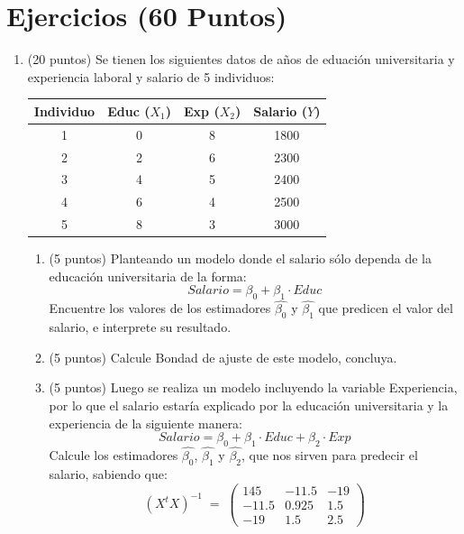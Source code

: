 \documentclass[10pt,a4paper]{article}
\begin{document}
\section{Ejercicios (60 Puntos)}

\begin{enumerate}


\item (20 puntos) Se tienen los siguientes datos de años de eduación universitaria y experiencia laboral y salario de 5 individuos:
\begin{center}
\begin{tabular}{|c|c|c|c|}
\hline
\textbf{Individuo} & \textbf{Educ} ($X_1$) & \textbf{Exp} ($X_2$)  & \textbf{Salario ($Y$)}\\
\hline
1 & 0 &  8 & 1800 \\
2 & 2 &  6 & 2300 \\
3 & 4 &  5 & 2400 \\
4 & 6 &  4 & 2500 \\
5 & 8 &  3 & 3000 \\
\hline
\end{tabular}
\end{center}

\begin{enumerate}
    \item (5 puntos) Planteando un modelo donde el salario sólo dependa de la educación universitaria de la forma:
    $$Salario = \beta_0 + \beta_1 \cdot Educ$$
    Encuentre los valores de los estimadores $\hat{\beta_0}$ y $\hat{\beta_1}$ que predicen el valor del salario, e interprete su resultado.
    
    \item (5 puntos) Calcule Bondad de ajuste de este modelo, concluya.
        
    \item (5 puntos) Luego se realiza un modelo incluyendo la variable Experiencia, por lo que el salario estaría explicado por la educación universitaria y la experiencia de la siguiente manera:
    $$Salario = \beta_0 + \beta_1 \cdot Educ + \beta_2 \cdot Exp$$
    Calcule los estimadores $\hat{\beta_0}$, $\hat{\beta_1}$ y $\hat{\beta_2}$, que nos sirven para predecir el salario, sabiendo que:
    \[
(X^tX)^{-1} \;=\;
\begin{pmatrix}
145 & -11.5 & -19 \\
-11.5 & 0.925 & 1.5 \\
-19 & 1.5 & 2.5
\end{pmatrix}
\]


\end{enumerate}
\end{enumerate}
\end{document}
